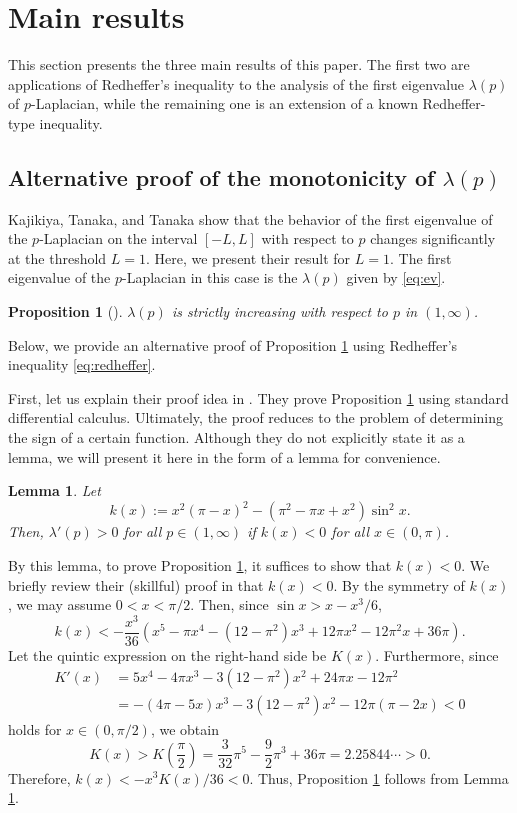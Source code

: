 \documentclass[12pt]{amsart}
\numberwithin{equation}{section}
\theoremstyle{plain}
\newtheorem{lem}[thm]{Lemma}
\newtheorem{prop}[thm]{Proposition}
\theoremstyle{definition}
\theoremstyle{remark}
\begin{document}
\section{Main results}

This section presents the three main results of this paper.
The first two are applications of Redheffer's inequality to 
the analysis of the first eigenvalue $\lambda (p)$ of $p$-Laplacian, 
while the remaining one is an extension of a known Redheffer-type inequality.

\subsection{Alternative proof of the monotonicity of $\lambda(p)$}

Kajikiya, Tanaka, and Tanaka \cite{KTT2017} show that the 
behavior of the first eigenvalue of the $p$-Laplacian on the 
interval $[-L,L]$ with respect to $p$ changes significantly 
at the threshold $L=1$. Here, we present their result for $L=1$.
The first eigenvalue of the $p$-Laplacian in this case is 
the $\lambda(p)$ given by 
\eqref{eq:ev}. 

\begin{prop}[\cite{KTT2017}]
\label{thm:KTT}
$\lambda(p)$ is strictly increasing with respect to $p$
in $(1,\infty)$.
\end{prop}

Below, we provide an alternative proof of Proposition 
\ref{thm:KTT} using Redheffer's inequality \eqref{eq:redheffer}.

First, let us explain their proof idea in \cite{KTT2017}. 
They prove Proposition \ref{thm:KTT} using standard differential calculus. 
Ultimately, the proof reduces to the problem of determining the sign 
of a certain function. Although they do not explicitly state it as a 
lemma, we will present it here in the form of a lemma for convenience.

\begin{lem}
\label{lem:KTT}
Let 
\[k(x):=x^2(\pi-x)^2-(\pi^2-\pi x+x^2)\sin^2{x}.\]
Then, $\lambda'(p)>0$ for all $p \in (1,\infty)$ 
if $k(x)<0$ for all $x \in (0,\pi)$.
\end{lem}

By this lemma, to prove Proposition \ref{thm:KTT}, 
it suffices to show that $k(x) < 0$.
We briefly review their (skillful) proof in \cite{KTT2017} that $k(x) < 0$.
By the symmetry of $k(x)$, we may assume $0 < x < \pi/2$. Then, since $\sin x > x - x^3/6$,
\[k(x)<-\frac{x^3}{36}(x^5-\pi x^4-(12-\pi^2)x^3+12\pi x^2-12\pi^2 x+36\pi).\]
Let the quintic expression on the right-hand side be $K(x)$. 
Furthermore, since
\begin{align*}
K'(x)
&=5x^4-4\pi x^3-3(12-\pi^2)x^2+24\pi x-12\pi^2\\
&=-(4\pi-5x)x^3-3(12-\pi^2)x^2-12\pi(\pi-2x)<0
\end{align*}
holds for $x \in (0,\pi/2)$, we obtain
\[K(x)>K\left(\frac{\pi}{2}\right)=\frac{3}{32}\pi^5-\frac{9}{2}\pi^3+36\pi=2.25844\cdots>0.\]
Therefore, $k(x)<-x^3K(x)/36<0$.
Thus, Proposition \ref{thm:KTT} follows from Lemma \ref{lem:KTT}.
\end{document}
